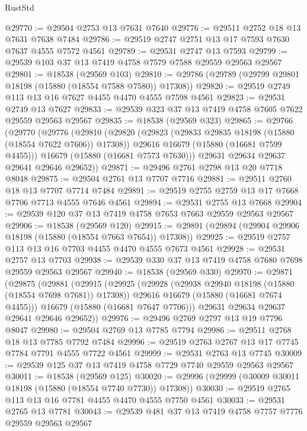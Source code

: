 \begin{lexlean}{RustStd}
\begin{coremodule}
@29770 := @29504 @2753 @13 @7631 @7640
@29776 := @29511 @2752 @18 @13 @7631 @7638 @7484
@29786 := @29519 @2747 @2751 @13 @17 @7593 @7630 @7637 @4555 @7572 @4561
@29789 := @29531 @2747 @13 @7593
@29799 := @29539 @103 @37 @13 @7419 @4758 @7579 @7588 @29559 @29563 @29567
@29801 := @18538 (@29569 @103)
@29810 := @29786 (@29789 (@29799 @29801 @18198 (@15880 (@18554 @7588 @7580)) @17308))
@29820 := @29519 @2749 @113 @13 @16 @7627 @4455 @4470 @4555 @7598 @4561
@29823 := @29531 @2749 @13 @7627
@29833 := @29539 @323 @37 @13 @7419 @4758 @7605 @7622 @29559 @29563 @29567
@29835 := @18538 (@29569 @323)
@29865 := @29766
    (@29770
      (@29776
        (@29810
          (@29820
            (@29823 (@29833 @29835 @18198 (@15880 (@18554 @7622 @7606)) @17308))
            @29616
            @16679
            (@15880 (@16681 @7599 @4455)))
          @16679
          (@15880 (@16681 @7573 @7630)))
        @29631
        @29634
        @29637
        @29641
        @29646
        @29652))
@29871 := @29496 @2761 @2798 @13 @20 @7718 @8048
@29875 := @29504 @2761 @13 @7707 @7716
@29881 := @29511 @2760 @18 @13 @7707 @7714 @7484
@29891 := @29519 @2755 @2759 @13 @17 @7668 @7706 @7713 @4555 @7646 @4561
@29894 := @29531 @2755 @13 @7668
@29904 := @29539 @120 @37 @13 @7419 @4758 @7653 @7663 @29559 @29563 @29567
@29906 := @18538 (@29569 @120)
@29915 := @29891 (@29894 (@29904 @29906 @18198 (@15880 (@18554 @7663 @7654)) @17308))
@29925 := @29519 @2757 @113 @13 @16 @7703 @4455 @4470 @4555 @7673 @4561
@29928 := @29531 @2757 @13 @7703
@29938 := @29539 @330 @37 @13 @7419 @4758 @7680 @7698 @29559 @29563 @29567
@29940 := @18538 (@29569 @330)
@29970 := @29871
    (@29875
      (@29881
        (@29915
          (@29925
            (@29928 (@29938 @29940 @18198 (@15880 (@18554 @7698 @7681)) @17308))
            @29616
            @16679
            (@15880 (@16681 @7674 @4455)))
          @16679
          (@15880 (@16681 @7647 @7706)))
        @29631
        @29634
        @29637
        @29641
        @29646
        @29652))
@29976 := @29496 @2769 @2797 @13 @19 @7796 @8047
@29980 := @29504 @2769 @13 @7785 @7794
@29986 := @29511 @2768 @18 @13 @7785 @7792 @7484
@29996 := @29519 @2763 @2767 @13 @17 @7745 @7784 @7791 @4555 @7722 @4561
@29999 := @29531 @2763 @13 @7745
@30009 := @29539 @125 @37 @13 @7419 @4758 @7729 @7740 @29559 @29563 @29567
@30011 := @18538 (@29569 @125)
@30020 := @29996 (@29999 (@30009 @30011 @18198 (@15880 (@18554 @7740 @7730)) @17308))
@30030 := @29519 @2765 @113 @13 @16 @7781 @4455 @4470 @4555 @7750 @4561
@30033 := @29531 @2765 @13 @7781
@30043 := @29539 @481 @37 @13 @7419 @4758 @7757 @7776 @29559 @29563 @29567

\end{coremodule}
\end{lexlean}

